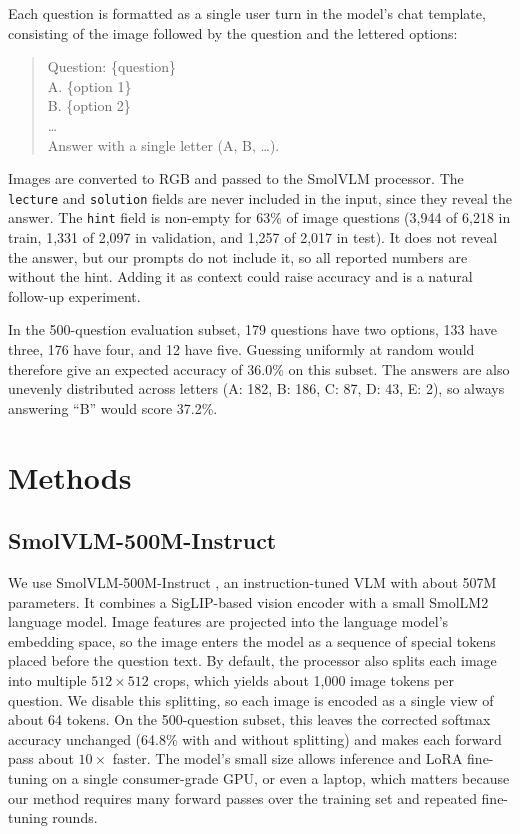 \documentclass{article}
\begin{document}
Each question is formatted as a single user turn in the model's chat template, consisting of the image followed by the question and the lettered options:
\begin{quote}\small\ttfamily
Question: \{question\}\\
A. \{option 1\}\\
B. \{option 2\}\\
\ldots\\
Answer with a single letter (A, B, \ldots).
\end{quote}
Images are converted to RGB and passed to the SmolVLM processor. The \texttt{lecture} and \texttt{solution} fields are never included in the input, since they reveal the answer. The \texttt{hint} field is non-empty for 63\% of image questions (3,944 of 6,218 in train, 1,331 of 2,097 in validation, and 1,257 of 2,017 in test). It does not reveal the answer, but our prompts do not include it, so all reported numbers are without the hint. Adding it as context could raise accuracy and is a natural follow-up experiment.

In the 500-question evaluation subset, 179 questions have two options, 133 have three, 176 have four, and 12 have five. Guessing uniformly at random would therefore give an expected accuracy of 36.0\% on this subset. The answers are also unevenly distributed across letters (A: 182, B: 186, C: 87, D: 43, E: 2), so always answering ``B'' would score 37.2\%.

\section{Methods}

\subsection{SmolVLM-500M-Instruct}
We use SmolVLM-500M-Instruct \citep{marafioti2025smolvlm}, an instruction-tuned VLM with about 507M parameters. It combines a SigLIP-based vision encoder \citep{zhai2023siglip} with a small SmolLM2 language model. Image features are projected into the language model's embedding space, so the image enters the model as a sequence of special tokens placed before the question text. By default, the processor also splits each image into multiple $512 \times 512$ crops, which yields about 1,000 image tokens per question. We disable this splitting, so each image is encoded as a single view of about 64 tokens. On the 500-question subset, this leaves the corrected softmax accuracy unchanged (64.8\% with and without splitting) and makes each forward pass about $10\times$ faster. The model's small size allows inference and LoRA fine-tuning on a single consumer-grade GPU, or even a laptop, which matters because our method requires many forward passes over the training set and repeated fine-tuning rounds.
\end{document}
